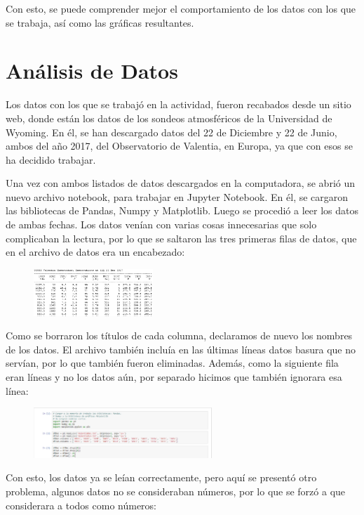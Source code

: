 \documentclass[a4paper]{article}
\begin{document}
Con esto, se puede comprender mejor el comportamiento de los datos con los que se trabaja, así como las gráficas resultantes. 

\section{Análisis de Datos}

Los datos con los que se trabajó en la actividad, fueron recabados desde un sitio web, donde están los datos de los sondeos atmosféricos de la Universidad de Wyoming. En él, se han descargado datos del 22 de Diciembre y 22 de Junio, ambos del año 2017, del Observatorio de Valentia, en Europa, ya que con esos se ha decidido trabajar. 

Una vez con ambos listados de datos descargados en la computadora, se abrió un nuevo archivo notebook, para trabajar en Jupyter Notebook. En él, se cargaron las bibliotecas de Pandas, Numpy y Matplotlib. Luego se procedió a leer los datos de ambas fechas. Los datos venían con varias cosas innecesarias que solo complicaban la lectura, por lo que se saltaron las tres primeras filas de datos, que en el archivo de datos era un encabezado:
\bigskip
\begin{figure}[h!]
 \centering
  \includegraphics[width=0.4\textwidth]{Dat.PNG}
 \end{figure}
\bigskip
Como se borraron los títulos de cada columna, declaramos de nuevo los nombres de los datos. El archivo también incluía en las últimas líneas datos basura que no servían, por lo que también fueron eliminadas.  Además, como la siguiente fila eran líneas y no los datos aún, por separado hicimos que también ignorara esa línea:
\bigskip
\begin{figure}[h!]
 \centering
  \includegraphics[width=0.6\textwidth]{LecDat1.PNG}
 \end{figure}
 \bigskip
 Con esto, los datos ya se leían correctamente, pero aquí se presentó otro problema, algunos datos no se consideraban números, por lo que se forzó a que considerara a todos como números:
\end{document}
